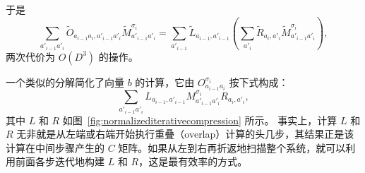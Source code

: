 于是
\begin{equation}
\sum_{a'_{i-1}a'_i} \tilde{O}_{a_{i-1}a_i,a'_{i-1}a'_i} \tilde{M}^{\sigma_i}_{a'_{i-1}a'_i} =
\sum_{a'_{i-1}} \tilde{L}_{a_{i-1},a'_{i-1}} \left( \sum_{a'_i} \tilde{R}_{a_{i},a'_{i}}
 \tilde{M}^{\sigma_i}_{a'_{i-1}a'_i} \right),
\end{equation}
两次代价为 $O(D^3)$ 的操作。

一个类似的分解简化了向量 $b$ 的计算，它由 $O^{\sigma_i}_{a_{i-1}a_i}$ 按下式构成：
\begin{equation}
\sum_{a'_{i-1}a'_i} L_{a_{i-1},a'_{i-1}} M^{\sigma_i}_{a'_{i-1}a'_i} R_{a_{i},a'_{i}} , 
\end{equation}
其中 $L$ 和 $R$ 如图~\ref{fig:normalizediterativecompression} 所示。
事实上，计算 $L$ 和 $R$ 无非就是从左端或右端开始执行重叠（overlap）计算的头几步，其结果正是该计算在中间步骤产生的 $C$ 矩阵。如果从左到右再折返地扫描整个系统，就可以利用前面各步迭代地构建 $L$ 和 $R$，这是最有效率的方式。

